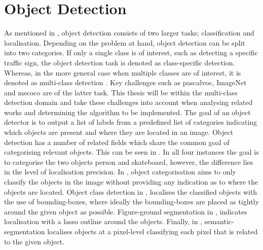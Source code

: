 \section{Object Detection}
As mentioned in , object detection consists of two larger tasks; classification and localisation. Depending on the problem at hand, object detection can be split into two categories. If only a single class is of interest, such as detecting a specific traffic sign, the object detection task is denoted as class-specific detection. Whereas, in the more general case when multiple classes are of interest, it is denoted as multi-class detection \cite{zhang}. Key challenges such as \gls{pascalvoc}, ImageNet and \gls{mscoco} are of the latter task. This thesis will be within the multi-class detection domain and take these challenges into account when analysing related works and determining the algorithm to be implemented. The goal of an object detector is to output a list of labels from a predefined list of categories indicating which objects are present and where they are located in an image. Object detection has a number of related fields which share the common goal of categorising relevant objects. This can be seen in . In all four instances the goal is to categorise the two objects person and skateboard, however, the difference lies in the level of localisation precision. In , object categorisation aims to only classify the objects in the image without providing any indication as to where the objects are located. Object class detection in , localises the classified objects with the use of bounding-boxes, where ideally the bounding-boxes are placed as tightly around the given object as possible. Figure-ground segmentation in , indicates localisation with a lasso outline around the objects. Finally, in , semantic-segmentation localises objects at a pixel-level classifying each pixel that is related to the given object. 



